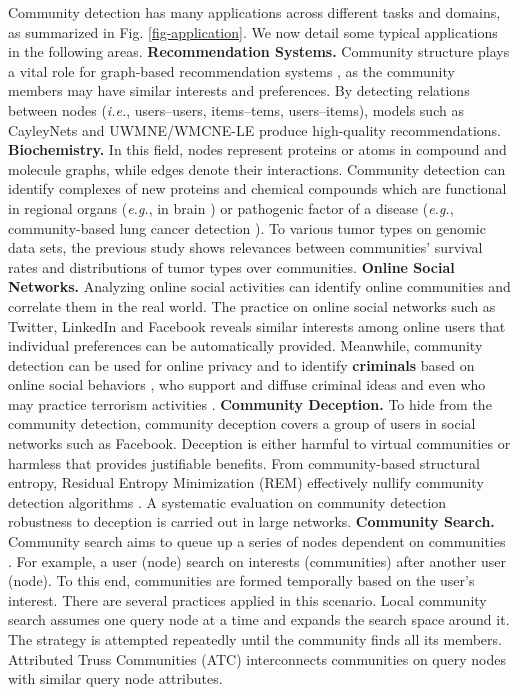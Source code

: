 \label{sec-application} 
Community detection has many applications across different tasks and domains, as summarized in Fig. \ref{fig-application}. We now detail some typical applications in the following areas.
\vspace{2mm}
\noindent
\textbf{Recommendation Systems.} Community structure plays a vital role for graph-based recommendation systems , as the community members may have similar interests and preferences. By detecting relations between nodes (\textit{i.e.}, users--users, items--tems, users--items), models such as CayleyNets  and UWMNE/WMCNE-LE  produce high-quality recommendations.
\vspace{2mm}
\noindent
\textbf{Biochemistry.} In this field, nodes represent proteins or atoms in compound and molecule graphs, while edges denote their interactions. Community detection can identify complexes of new proteins  and chemical compounds which are functional in regional organs (\textit{e.g.}, in brain ) or pathogenic factor of a disease (\textit{e.g.}, community-based lung cancer detection ). To various tumor types on genomic data sets, the previous study  shows relevances between communities' survival rates and distributions of tumor types over communities.
\vspace{2mm}
\noindent
\textbf{Online Social Networks.} 
Analyzing online social activities can identify online communities and correlate them in the real world. The practice on online social networks  such as Twitter, LinkedIn and Facebook reveals similar interests among online users that individual preferences can be automatically provided. Meanwhile, community detection can be used for online privacy  and to identify \textbf{criminals} based on online social behaviors , who support and diffuse criminal ideas and even who may practice terrorism activities .
\vspace{2mm}
\noindent
\textbf{Community Deception.} To hide from the community detection, community deception  covers a group of users in social networks such as Facebook. Deception is either harmful to virtual communities or harmless that provides justifiable benefits. From community-based structural entropy, Residual Entropy Minimization (REM) effectively nullify community detection algorithms . A systematic evaluation  on community detection robustness to deception is carried out in large networks.
\vspace{2mm}
\noindent
\textbf{Community Search.} Community search aims to queue up a series of nodes dependent on communities . For example, a user (node) search on interests (communities) after another user (node). To this end, communities are formed temporally based on the user's interest. There are several practices applied in this scenario. Local community search  assumes one query node at a time and expands the search space around it. The strategy is attempted repeatedly until the community finds all its members. Attributed Truss Communities (ATC)  interconnects communities on query nodes with similar query node attributes.
